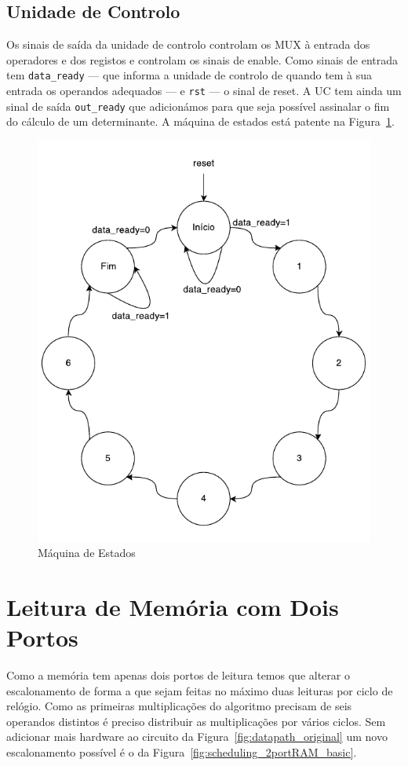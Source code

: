 \documentclass[a4paper]{article}
\begin{document}
\subsection{Unidade de Controlo}

Os sinais de saída da unidade de controlo controlam os MUX à entrada dos operadores e dos registos e controlam os sinais de enable. Como sinais de entrada tem \texttt{data\_ready} --- que informa a unidade de controlo de quando tem à sua entrada os operandos adequados --- e \texttt{rst} --- o sinal de reset. A UC tem ainda um sinal de saída \texttt{out\_ready} que adicionámos para que seja possível assinalar o fim do cálculo de um determinante. A máquina de estados está patente na Figura~\ref{fig:statemachine}.

\begin{figure}[h]
	\centering
	\includegraphics[width=0.4\linewidth]{schem_sm}
	\caption{Máquina de Estados}
	\label{fig:statemachine}
\end{figure}

\pagebreak
\section{Leitura de Memória com Dois Portos}
\label{sec:leitura_mem_2portos}

Como a memória tem apenas dois portos de leitura temos que alterar o escalonamento de forma a que sejam feitas no máximo duas leituras por ciclo de relógio. Como as primeiras multiplicações do algoritmo precisam de seis operandos distintos é preciso distribuir as multiplicações por vários ciclos. Sem adicionar mais hardware ao circuito da Figura~\ref{fig:datapath_original} um novo escalonamento possível é o da Figura~\ref{fig:scheduling_2portRAM_basic}.
\end{document}
